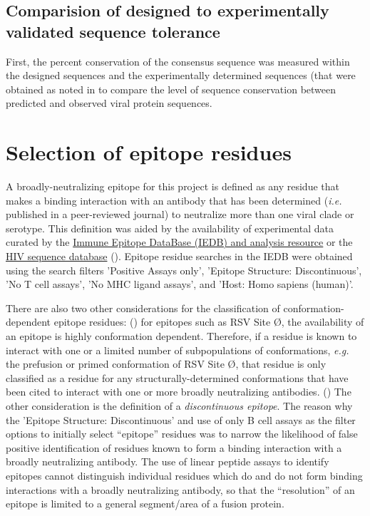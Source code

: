 \documentclass[10pt]{article}
\begin{document}
\subsection{Comparision of designed to experimentally validated sequence tolerance}

First, the percent conservation of the consensus sequence was measured within the designed sequences and the experimentally determined sequences (that were obtained as noted in  to compare the level of sequence conservation between predicted and observed viral protein sequences. 


\section{Selection of epitope residues}

A broadly-neutralizing epitope for this project is defined as any residue that makes a binding interaction with an antibody that has been determined (\textit{i.e.} published in a peer-reviewed journal) to neutralize more than one viral clade or serotype. This definition was aided by the availability of experimental data curated by the \href{iedb.org}{Immune Epitope DataBase (IEDB) and analysis resource} or the \href{https://www.hiv.lanl.gov/components/sequence/HIV/featuredb/search/env_ab_search_pub.comp}{HIV sequence database} (). Epitope residue searches in the IEDB were obtained using the search filters 'Positive Assays only', 'Epitope Structure: Discontinuous', 'No T cell assays', 'No MHC ligand assays', and 'Host: Homo sapiens (human)'.

There are also two other considerations for the classification of conformation-dependent epitope residues: () for epitopes such as RSV Site \O, the availability of an epitope is highly conformation dependent. Therefore, if a residue is known to interact with one or a limited number of subpopulations of conformations, \textit{e.g.} the prefusion or primed conformation of RSV Site \O, that residue is only classified as a residue for any structurally-determined conformations that have been cited to interact with one or more broadly neutralizing antibodies. () The other consideration is the definition of a \textit{discontinuous epitope}. The reason why the 'Epitope Structure: Discontinuous' and use of only B cell assays as the filter options to initially select ``epitope'' residues was to narrow the likelihood of false positive identification of residues known to form a binding interaction with a broadly neutralizing antibody. The use of linear peptide assays to identify epitopes cannot distinguish individual residues which do and do not form binding interactions with a broadly neutralizing antibody, so that the ``resolution'' of an epitope is limited to a general segment/area of a fusion protein.
\end{document}
